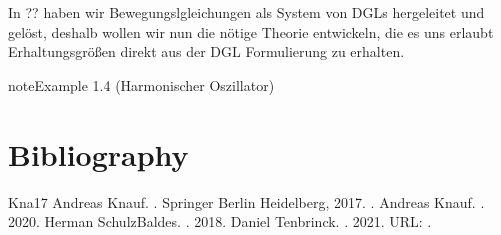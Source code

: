 \documentclass[letterpaper,10pt,english]{jupyterBook}
\begin{document}
In ?? haben wir Bewegungslgleichungen als System von DGLs hergeleitet und gelöst, deshalb wollen wir nun die nötige Theorie entwickeln, die es uns erlaubt Erhaltungsgrößen direkt aus der DGL Formulierung zu erhalten.
\label{ode/hamilton:example-0}
\begin{sphinxadmonition}{note}{Example 1.4 (Harmonischer Oszillator)}


\end{sphinxadmonition}


\chapter{Bibliography}
\label{\detokenize{references:bibliography}}\label{\detokenize{references::doc}}


\begin{sphinxthebibliography}{Kna17}
Andreas Knauf. . Springer Berlin Heidelberg, 2017. .
Andreas Knauf. . 2020.
Herman Schulz\sphinxhyphen{}Baldes. . 2018.
Daniel Tenbrinck. . 2021. URL: .
\end{sphinxthebibliography}
\end{document}
